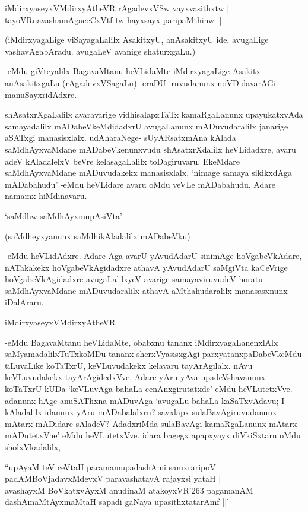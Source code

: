 \begin{shloka}
iMdirxyaseyxVMdirxyAtheVR rAgadevxVSw vayxvasithxtw |\\
tayoVRnavashamAgaceCxVtf tw hayxsayx paripaMthinw ||
\end{shloka}

(iMdirxyagaLige viSayagaLalilx AsakitxyU, anAsakitxyU ide. avugaLige vashavAgabAradu. avugaLeV avanige shaturxgaLu.)

-eMdu giVteyalilx BagavaMtanu heVLidaMte iMdirxyagaLige Asakitx anAsakitxgaLu (rAgadevxVSagaLu) -eraDU iruvudanunx noVDidavarAGi manuSayxridAdxre.

shAsatxrXgaLalilx avaravarige vidhisalapxTaTx kamaRgaLanunx upayukatxvAda samayadalilx mADabeVkeMdidadxrU avugaLanunx mADuvudaralilx janarige aSATxgi manasisxlalx. udAharaNege- sUyARsatxmAna kAlada saMdhAyxvaMdane mADabeVkenunxvudu shAsatxrXdalilx heVLidadxre, avaru adeV kAladalelxV beVre kelasagaLalilx toDagiruvaru. EkeMdare saMdhAyxvaMdane mADuvudakekx manasisxlalx, `nimage samaya sikikxdAga mADabahudu' -eMdu heVLidare avaru oMdu veVLe mADabahudu. Adare namamx hiMdinavaru.-

\begin{shloka}
`saMdhw saMdhAyxmupAsiVta'
\end{shloka}

(saMdheyxyanunx saMdhikAladalilx mADabeVku)

-eMdu heVLidAdxre. Adare Aga avarU yAvudAdarU sinimAge hoVgabeVkAdare, nATakakekx hoVgabeVkAgidadxre athavA yAvudAdarU saMgiVta kaCeVrige hoVgabeVkAgidadxre avugaLalilxyeV avarige samayaviruvudeV horatu saMdhAyxvaMdane mADuvudaralilx athavA aMthahudaralilx manasasxnunx iDalAraru.

\begin{shloka}
iMdirxyaseyxVMdirxyAtheVR
\end{shloka}

-eMdu BagavaMtanu heVLidaMte, obabxnu tananx iMdirxyagaLanenxlAlx saMyamadalilxTuTxkoMDu tananx sherxVyasisxgAgi parxyatanxpaDabeVkeMdu tiLuvaLike koTaTxrU, keVLuvudakekx kelavaru tayArAgilalx. nAvu keVLuvudakekx tayArAgidedxVve. Adare yAru yAva upadeVshavanunx koTaTxrU kUDa `keVLuvAga bahaLa cenAnxgirutatxde' eMdu heVLutetxVve. adanunx hAge anuSAThxna mADuvAga `avugaLu bahaLa kaSaTxvAdavu; I kAladalilx idanunx yAru mADabalalxru? savxlapx sulaBavAgiruvudanunx mAtarx mADidare sAladeV? AdadxriMda sulaBavAgi kamaRgaLanunx mAtarx mADutetxVne' eMdu heVLutetxVve. idara bagegx apapxyayx diVkiSxtaru oMdu sholxVkadalilx,

\begin{shloka}
``upAyaM teV ceVtaH paramamupadashAmi samxraripoV\\
padAMBoVjadavxMdevxV paravashatayA rajayxsi yataH |\\
avashayxM BoVkatxvAyxM anudinaM atakoyxVR\char'263 pagamanAM\\
dashAmaMtAyxmaMtaH sapadi gaNaya upasithxtatarAmf ||'
\end{shloka}

